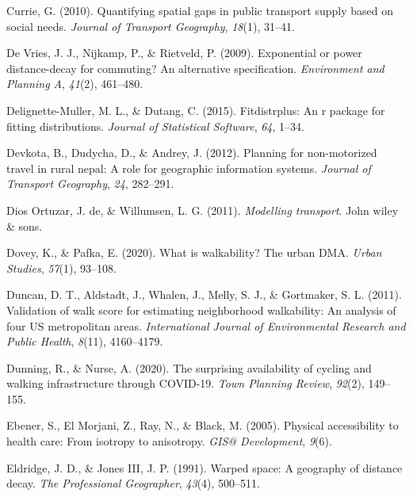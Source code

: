 \documentclass[12pt,twoside]{reedthesis}
\newlength{\cslhangindent}
\newenvironment{CSLReferences}[2] %
 {%
  \setlength{\parindent}{0pt}
  \ifodd #1 \everypar{\setlength{\hangindent}{\cslhangindent}}\ignorespaces\fi
  \ifnum #2 > 0
  \setlength{\parskip}{#2\baselineskip}
  \fi
 }%
 {}
\begin{document}
\begin{CSLReferences}{1}{0}
\leavevmode{}%
Currie, G. (2010). Quantifying spatial gaps in public transport supply based on social needs. \emph{Journal of Transport Geography}, \emph{18}(1), 31--41.

\leavevmode{}%
De Vries, J. J., Nijkamp, P., \& Rietveld, P. (2009). Exponential or power distance-decay for commuting? An alternative specification. \emph{Environment and Planning A}, \emph{41}(2), 461--480.

\leavevmode{}%
Delignette-Muller, M. L., \& Dutang, C. (2015). Fitdistrplus: An r package for fitting distributions. \emph{Journal of Statistical Software}, \emph{64}, 1--34.

\leavevmode{}%
Devkota, B., Dudycha, D., \& Andrey, J. (2012). Planning for non-motorized travel in rural nepal: A role for geographic information systems. \emph{Journal of Transport Geography}, \emph{24}, 282--291.

\leavevmode{}%
Dios Ortuzar, J. de, \& Willumsen, L. G. (2011). \emph{Modelling transport}. John wiley \& sons.

\leavevmode{}%
Dovey, K., \& Pafka, E. (2020). What is walkability? The urban DMA. \emph{Urban Studies}, \emph{57}(1), 93--108.

\leavevmode{}%
Duncan, D. T., Aldstadt, J., Whalen, J., Melly, S. J., \& Gortmaker, S. L. (2011). Validation of walk score for estimating neighborhood walkability: An analysis of four US metropolitan areas. \emph{International Journal of Environmental Research and Public Health}, \emph{8}(11), 4160--4179.

\leavevmode{}%
Dunning, R., \& Nurse, A. (2020). The surprising availability of cycling and walking infrastructure through COVID-19. \emph{Town Planning Review}, \emph{92}(2), 149--155.

\leavevmode{}%
Ebener, S., El Morjani, Z., Ray, N., \& Black, M. (2005). Physical accessibility to health care: From isotropy to anisotropy. \emph{GIS@ Development}, \emph{9}(6).

\leavevmode{}%
Eldridge, J. D., \& Jones III, J. P. (1991). Warped space: A geography of distance decay. \emph{The Professional Geographer}, \emph{43}(4), 500--511.


\end{CSLReferences}
\end{document}
